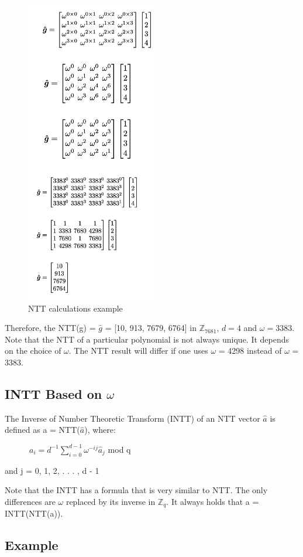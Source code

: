 \documentclass{techrep}
\theoremstyle{definition}
\theoremstyle{plain}
\newcommand{\Z}{\mathbb{Z}}
\begin{document}
\begin{figure}[H]
 	\centering
 	\includegraphics[width=.4\columnwidth]{fig/NTT_cal.png}
 	\caption{NTT calculations example} 
\label{fig:NTT_cal}
\end{figure}

Therefore, the NTT(g) = $\hat{g}$ = [10, 913, 7679, 6764] in $\Z_{7681}$, $d = 4$ and $\omega =3383$. Note that the NTT of a particular polynomial is not always unique. It depends on the choice of $\omega$. The NTT result will differ if one uses $\omega$ = 4298 instead of $\omega$ = 3383. 


\subsection{INTT Based on $\omega$}
The Inverse of Number Theoretic Transform (INTT) of an NTT vector $\hat{a}$ is defined as a = NTT($\hat{a}$), where:

$\quad \quad \quad a_i = d^{-1}\sum_{i=0}^{d - 1}\omega^{-ij}\hat{a}_j$ mod q

and j = 0, 1, 2, . . . , d - 1

Note that the INTT has a formula that is very similar to NTT. The only differences are $\omega$ replaced by its inverse in $\Z_{q}$. It always holds that a = INTT(NTT(a)).

\subsection{Example}
\end{document}

